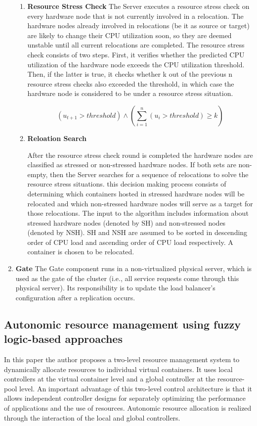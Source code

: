 \documentclass[12pt]{article} %
\begin{document}
\begin{enumerate}
\begin{enumerate}
\item{\textbf{Resource Stress Check}} The Server executes a resource stress check on every hardware node that is not currently involved in a relocation. The hardware nodes already involved in relocations (be it as source or target) are likely to change their CPU utilization soon, so they are deemed unstable until all current relocations are completed.
The resource stress check consists of two steps. First, it verifies whether the predicted CPU utilization of the hardware node exceeds the CPU utilization threshold. Then, if the latter is true, it checks whether k out of the previous n resource stress checks also exceeded the threshold, in which case the hardware node is considered to be under a resource stress situation.

$$(u_{t+1} > threshold) \land (\sum_{i=1}^{n}(u_i > threshold)\geq k)$$
\item{\textbf{Reloation Search}} 


 After the resource stress check round is completed the hardware nodes are classified as stressed or non-stressed hardware nodes. If both sets are non-empty, then the Server searches for a sequence of relocations to solve the resource stress situations. this decision making process consists of determining which containers hosted in stressed hardware nodes will be relocated and which non-stressed hardware nodes will serve as a target for those relocations. The input to the algorithm includes information about stressed hardware nodes (denoted by SH) and non-stressed nodes (denoted by NSH). SH and NSH are assumed to be sorted in descending order of CPU load and ascending order of CPU load respectively. A container is chosen to be relocated. 

\end{enumerate}


\item{\textbf{Gate}} The Gate component runs in a non-virtualized physical server, which is used as the gate of the cluster (i.e., all service requests come through this physical server). Its responsibility is to update the load balancer’s configuration after a replication occurs.
\end{enumerate}


\subsection{Autonomic resource management using
fuzzy logic-based approaches}

In this paper the author proposes a two-level resource management
system to dynamically allocate resources to individual
virtual containers. It uses local controllers at the virtual container
level and a global controller at the resource-pool
level. An important advantage of this two-level control architecture
is that it allows independent controller designs for
separately optimizing the performance of applications and
the use of resources. Autonomic resource allocation is realized
through the interaction of the local and global controllers.
\end{document}
